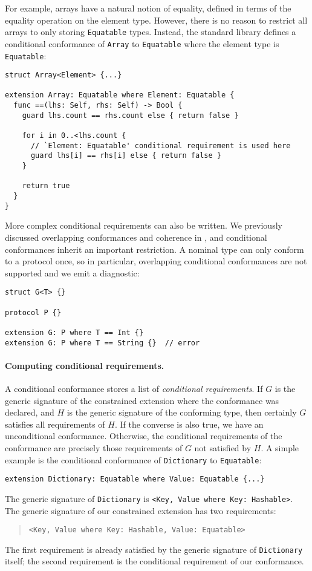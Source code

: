 \documentclass[../generics]{subfiles}
\begin{document}
For example, arrays have a natural notion of equality, defined in terms of the equality operation on the element type. However, there is no reason to restrict all arrays to only storing \texttt{Equatable} types. Instead, the standard library defines a conditional conformance of \texttt{Array} to \texttt{Equatable} where the element type is \texttt{Equatable}:
\begin{Verbatim}
struct Array<Element> {...}

extension Array: Equatable where Element: Equatable {
  func ==(lhs: Self, rhs: Self) -> Bool {
    guard lhs.count == rhs.count else { return false }

    for i in 0..<lhs.count {
      // `Element: Equatable' conditional requirement is used here
      guard lhs[i] == rhs[i] else { return false }
    }

    return true
  }
}
\end{Verbatim}
More complex conditional requirements can also be written. We previously discussed overlapping conformances and coherence in , and conditional conformances inherit an important restriction. A nominal type can only conform to a protocol once, so in particular, overlapping conditional conformances are not supported and we emit a diagnostic:
\begin{Verbatim}
struct G<T> {}

protocol P {}

extension G: P where T == Int {}
extension G: P where T == String {}  // error
\end{Verbatim}

\paragraph{Computing conditional requirements.}
A conditional conformance stores a list of \emph{conditional requirements}. If $G$ is the generic signature of the constrained extension where the conformance was declared, and $H$ is the generic signature of the conforming type, then certainly $G$ satisfies all requirements of $H$. If the converse is also true, we have an unconditional conformance. Otherwise, the conditional requirements of the conformance are precisely those requirements of $G$ not satisfied by $H$. A simple example is the conditional conformance of \texttt{Dictionary} to \texttt{Equatable}:
\begin{Verbatim}
extension Dictionary: Equatable where Value: Equatable {...}
\end{Verbatim}
The generic signature of \texttt{Dictionary} is \verb|<Key, Value where Key: Hashable>|. The generic signature of our constrained extension has two requirements:
\begin{quote}
\begin{verbatim}
<Key, Value where Key: Hashable, Value: Equatable>
\end{verbatim}
\end{quote}
The first requirement is already satisfied by the generic signature of \texttt{Dictionary} itself; the second requirement is the conditional requirement of our conformance.
\end{document}
